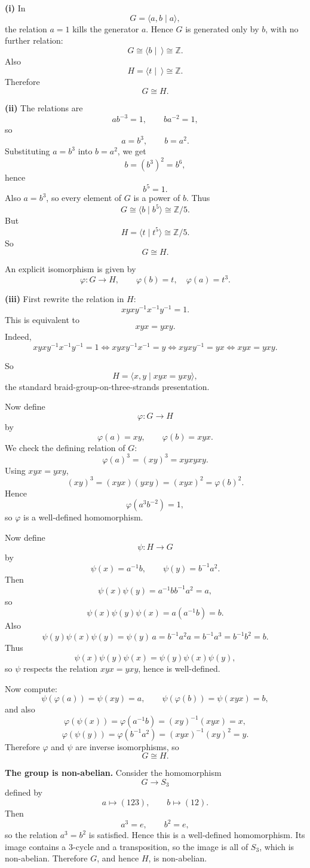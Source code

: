 \begin{solution}
\textbf{(i)}
In
\[
G=\langle a,b\mid a\rangle,
\]
the relation \(a=1\) kills the generator \(a\). Hence \(G\) is generated only by \(b\), with no further relation:
\[
G\cong \langle b\mid \ \rangle \cong \mathbb{Z}.
\]
Also
\[
H=\langle t\mid \ \rangle \cong \mathbb{Z}.
\]
Therefore
\[
G\cong H.
\]

\textbf{(ii)}
The relations are
\[
ab^{-3}=1,\qquad ba^{-2}=1,
\]
so
\[
a=b^3,\qquad b=a^2.
\]
Substituting \(a=b^3\) into \(b=a^2\), we get
\[
b=(b^3)^2=b^6,
\]
hence
\[
b^5=1.
\]
Also \(a=b^3\), so every element of \(G\) is a power of \(b\). Thus
\[
G\cong \langle b\mid b^5\rangle \cong \mathbb{Z}/5.
\]
But
\[
H=\langle t\mid t^5\rangle \cong \mathbb{Z}/5.
\]
So
\[
G\cong H.
\]

An explicit isomorphism is given by
\[
\varphi:G\to H,\qquad \varphi(b)=t,\quad \varphi(a)=t^3.
\]

\textbf{(iii)}
First rewrite the relation in \(H\):
\[
xyxy^{-1}x^{-1}y^{-1}=1.
\]
This is equivalent to
\[
xyx=yxy.
\]
Indeed,
\[
xyxy^{-1}x^{-1}y^{-1}=1
\iff xyxy^{-1}x^{-1}=y
\iff xyxy^{-1}=yx
\iff xyx=yxy.
\]

So
\[
H=\langle x,y\mid xyx=yxy\rangle,
\]
the standard braid-group-on-three-strands presentation.

Now define
\[
\varphi:G\to H
\]
by
\[
\varphi(a)=xy,\qquad \varphi(b)=xyx.
\]
We check the defining relation of \(G\):
\[
\varphi(a)^3=(xy)^3=xyxyxy.
\]
Using \(xyx=yxy\),
\[
(xy)^3=(xyx)(yxy)=(xyx)^2=\varphi(b)^2.
\]
Hence
\[
\varphi(a^3b^{-2})=1,
\]
so \(\varphi\) is a well-defined homomorphism.

Now define
\[
\psi:H\to G
\]
by
\[
\psi(x)=a^{-1}b,\qquad \psi(y)=b^{-1}a^2.
\]
Then
\[
\psi(x)\psi(y)=a^{-1}bb^{-1}a^2=a,
\]
so
\[
\psi(x)\psi(y)\psi(x)=a(a^{-1}b)=b.
\]
Also
\[
\psi(y)\psi(x)\psi(y)=\psi(y)\,a
= b^{-1}a^2a
= b^{-1}a^3
= b^{-1}b^2
= b.
\]
Thus
\[
\psi(x)\psi(y)\psi(x)=\psi(y)\psi(x)\psi(y),
\]
so \(\psi\) respects the relation \(xyx=yxy\), hence is well-defined.

Now compute:
\[
\psi(\varphi(a))=\psi(xy)=a,\qquad
\psi(\varphi(b))=\psi(xyx)=b,
\]
and also
\[
\varphi(\psi(x))=\varphi(a^{-1}b)=(xy)^{-1}(xyx)=x,
\]
\[
\varphi(\psi(y))=\varphi(b^{-1}a^2)=(xyx)^{-1}(xy)^2=y.
\]
Therefore \(\varphi\) and \(\psi\) are inverse isomorphisms, so
\[
G\cong H.
\]

\textbf{The group is non-abelian.}
Consider the homomorphism
\[
G\to S_3
\]
defined by
\[
a\mapsto (123),\qquad b\mapsto (12).
\]
Then
\[
a^3=e,\qquad b^2=e,
\]
so the relation \(a^3=b^2\) is satisfied. Hence this is a well-defined homomorphism. Its image contains a \(3\)-cycle and a transposition, so the image is all of \(S_3\), which is non-abelian. Therefore \(G\), and hence \(H\), is non-abelian.


\end{solution}
